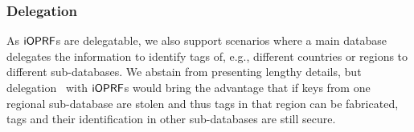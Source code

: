 \subsubsection{Delegation}
As $\mathsf{i}\mathsf{OPRF}$s are delegatable, we also support scenarios where a main
database delegates the information to identify tags of, e.g.,
different countries or regions to different sub-databases.  We abstain
from presenting lengthy details, but delegation~\cite{sherman2}
with $\mathsf{i}\mathsf{OPRF}$s would bring the advantage that if keys from one
regional sub-database are stolen and thus tags in that region can be
fabricated, tags and their identification in other sub-databases are
still secure.
